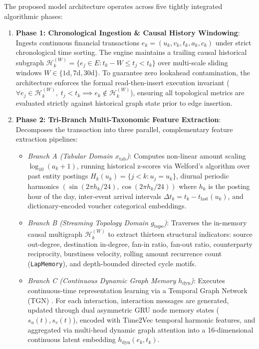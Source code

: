 \documentclass[journal]{IEEEtran}
\begin{document}
The proposed model architecture operates across five tightly integrated algorithmic phases:
\begin{enumerate}
    \item \textbf{Phase 1: Chronological Ingestion \& Causal History Windowing}: Ingests continuous financial transactions $e_k = (u_k, v_k, t_k, a_k, c_k)$ under strict chronological time sorting. The engine maintains a trailing causal historical subgraph $\mathcal{H}_k^{(W)} = \{ e_j \in E : t_k - W \le t_j < t_k \}$ over multi-scale sliding windows $W \in \{1\text{d}, 7\text{d}, 30\text{d}\}$. To guarantee zero lookahead contamination, the architecture enforces the formal read-then-insert execution invariant ($\forall e_j \in \mathcal{H}_k^{(W)}, \; t_j < t_k \implies e_k \notin \mathcal{H}_k^{(W)}$), ensuring all topological metrics are evaluated strictly against historical graph state prior to edge insertion.
    \item \textbf{Phase 2: Tri-Branch Multi-Taxonomic Feature Extraction}: Decomposes the transaction into three parallel, complementary feature extraction pipelines:
    \begin{itemize}
        \item \textit{Branch A (Tabular Domain $x_{\text{tab}}$)}: Computes non-linear amount scaling $\log_{10}(a_k + 1)$, running historical z-scores via Welford's algorithm over past entity postings $H_k(u_k) = \{j < k : u_j = u_k\}$, diurnal periodic harmonics $(\sin(2\pi h_k / 24), \cos(2\pi h_k / 24))$ where $h_k$ is the posting hour of the day, inter-event arrival intervals $\Delta t_k = t_k - t_{\text{last}}(u_k)$, and dictionary-encoded voucher categorical embeddings.
        \item \textit{Branch B (Streaming Topology Domain $g_{\text{topo}}$)}: Traverses the in-memory causal multigraph $\mathcal{H}_k^{(W)}$ to extract thirteen structural indicators: source out-degree, destination in-degree, fan-in ratio, fan-out ratio, counterparty reciprocity, burstiness velocity, rolling amount recurrence count (\texttt{LapMemory}), and depth-bounded directed cycle motifs.
        \item \textit{Branch C (Continuous Dynamic Graph Memory $h_{\text{dyn}}$)}: Executes continuous-time representation learning via a Temporal Graph Network (TGN) \cite{rossi2020temporal}. For each interaction, interaction messages are generated, updated through dual asymmetric GRU node memory states ($s_u(t), s_v(t)$), encoded with Time2Vec temporal harmonic features, and aggregated via multi-head dynamic graph attention into a 16-dimensional continuous latent embedding $h_{\text{dyn}}(e_k, t_k)$.

\end{itemize}
\end{enumerate}
\end{document}
